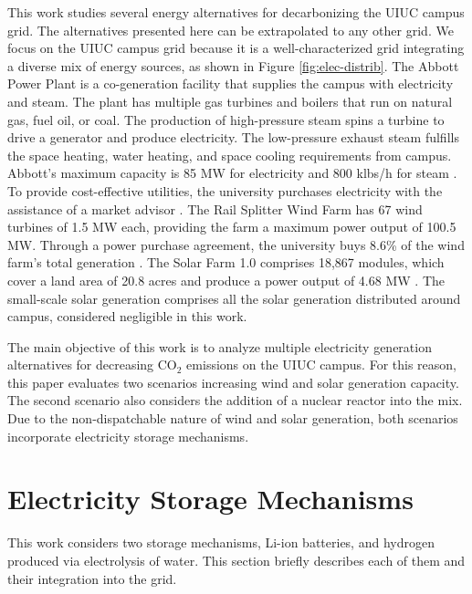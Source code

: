 \documentclass{anstrans}
\begin{document}
This work studies several energy alternatives for decarbonizing the \gls{UIUC} campus grid.
The alternatives presented here can be extrapolated to any other grid.
We focus on the \gls{UIUC} campus grid because it is a well-characterized grid integrating a diverse mix of energy sources, as shown in Figure \ref{fig:elec-distrib}.
The Abbott Power Plant is a co-generation facility that supplies the campus with electricity and steam.
The plant has multiple gas turbines and boilers that run on natural gas, fuel oil, or coal.
The production of high-pressure steam spins a turbine to drive a generator and produce electricity.
The low-pressure exhaust steam fulfills the space heating, water heating, and space cooling requirements from campus.
Abbott’s maximum capacity is 85 MW for electricity and 800 klbs/h for steam \cite{uiucfs_abbott_nodate}.
To provide cost-effective utilities, the university purchases electricity with the assistance of a market advisor \cite{uiucfs_energy_2015}.
The Rail Splitter Wind Farm has 67 wind turbines of 1.5 MW each, providing the farm a maximum power output of 100.5 MW.
Through a power purchase agreement, the university buys 8.6\% of the wind farm's total generation \cite{rail_splitter_illinois_2016, uiucfs_energy_2015}.
The Solar Farm 1.0 comprises 18,867 modules, which cover a land area of 20.8 acres and produce a power output of 4.68 MW \cite{uiucfs_solar_2017}.
The small-scale solar generation comprises all the solar generation distributed around campus, considered negligible in this work.

The main objective of this work is to analyze multiple electricity generation alternatives for decreasing CO$_2$ emissions on the UIUC campus.
For this reason, this paper evaluates two scenarios increasing wind and solar generation capacity.
The second scenario also considers the addition of a nuclear reactor into the mix.
Due to the non-dispatchable nature of wind and solar generation, both scenarios incorporate electricity storage mechanisms.


\section{Electricity Storage Mechanisms}

This work considers two storage mechanisms, Li-ion batteries, and hydrogen produced via electrolysis of water.
This section briefly describes each of them and their integration into the grid.
\end{document}
